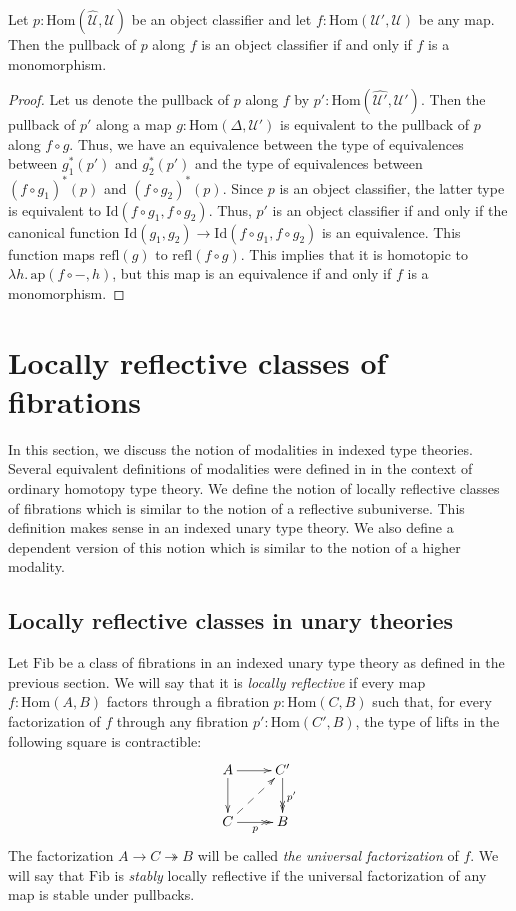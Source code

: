 \documentclass[reqno]{amsart}
\theoremstyle{definition}
\theoremstyle{remark}
\newcommand{\fs}[1]{\mathrm{#1}}
\newcommand{\Hom}{\fs{Hom}}
\newcommand{\Id}{\fs{Id}}
\newcommand{\refl}{\fs{refl}}
\newcommand{\pmap}{\fs{ap}}
\newcommand{\Fib}{\fs{Fib}}
\numberwithin{figure}{section}
\begin{document}
\begin{prop}
Let $p : \Hom(\widehat{\mathcal{U}},\mathcal{U})$ be an object classifier and let $f : \Hom(\mathcal{U}',\mathcal{U})$ be any map.
Then the pullback of $p$ along $f$ is an object classifier if and only if $f$ is a monomorphism.
\end{prop}
\begin{proof}
Let us denote the pullback of $p$ along $f$ by $p' : \Hom(\widehat{\mathcal{U}'},\mathcal{U}')$.
Then the pullback of $p'$ along a map $g : \Hom(\Delta,\mathcal{U}')$ is equivalent to the pullback of $p$ along $f \circ g$.
Thus, we have an equivalence between the type of equivalences between $g_1^*(p')$ and $g_2^*(p')$ and the type of equivalences between $(f \circ g_1)^*(p)$ and $(f \circ g_2)^*(p)$.
Since $p$ is an object classifier, the latter type is equivalent to $\Id(f \circ g_1, f \circ g_2)$.
Thus, $p'$ is an object classifier if and only if the canonical function $\Id(g_1,g_2) \to \Id(f \circ g_1, f \circ g_2)$ is an equivalence.
This function maps $\refl(g)$ to $\refl(f \circ g)$.
This implies that it is homotopic to $\lambda h.\,\pmap(f \circ -, h)$, but this map is an equivalence if and only if $f$ is a monomorphism.
\end{proof}

\section{Locally reflective classes of fibrations}
\label{sec:refl-fib}

In this section, we discuss the notion of modalities in indexed type theories.
Several equivalent definitions of modalities were defined in \cite{modality-hott} in the context of ordinary homotopy type theory.
We define the notion of locally reflective classes of fibrations which is similar to the notion of a reflective subuniverse.
This definition makes sense in an indexed unary type theory.
We also define a dependent version of this notion which is similar to the notion of a higher modality.

\subsection{Locally reflective classes in unary theories}

Let $\Fib$ be a class of fibrations in an indexed unary type theory as defined in the previous section.
We will say that it is \emph{locally reflective} if every map $f : \Hom(A,B)$ factors through a fibration $p : \Hom(C,B)$
such that, for every factorization of $f$ through any fibration $p' : \Hom(C',B)$, the type of lifts in the following square is contractible:
\[ \xymatrix{ A \ar[r] \ar[d]                   & C' \ar@{->>}[d]^{p'} \\
              C \ar@{->>}[r]_p \ar@{-->}[ur]    & B
            } \]
The factorization $A \to C \twoheadrightarrow B$ will be called \emph{the universal factorization} of $f$.
We will say that $\Fib$ is \emph{stably} locally reflective if the universal factorization of any map is stable under pullbacks.
\end{document}
